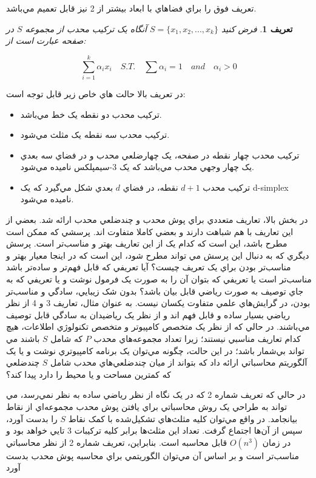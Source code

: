 \documentclass{book}
\newtheorem{defn}[section]{تعریف}
\begin{document}
تعريف فوق را براي فضاهاي با ابعاد بيشتر از 2 نيز قابل تعميم مي‌باشد.

\begin{defn}
    فرض کنيد $S=\{x_1, x_2, ...,x_k\}$ آنگاه يک ترکيب محدب از مجموعه $S$ در صفحه عبارت است از:
    
    $$ \sum_{i=1}^k\alpha_i x_i \quad S.T. \quad  \sum{\alpha_i}=1 \quad and \quad \alpha_i>0$$
\end{defn}


در تعريف بالا حالت هاي خاص زير قابل توجه است: 
\begin{itemize}
    \item
    ترکيب محدب دو نقطه يک خط مي‌باشد.
    \item
    ترکيب محدب سه نقطه يک مثلث مي‌شود.
    \item
    ترکيب محدب چهار نقطه در صفحه، يک چهارضلعي محدب و در فضاي سه بعدي  يک چهار وجهي محدب مي‌باشد که يک 3-سيمپلکس ناميده مي‌شود.
    \item
    ترکيب محدب $d+1$ نقطه، در فضاي $d$ بعدي شکل مي‌گيرد که يک d-simplex ناميده مي‌شود.
\end{itemize}

در بخش بالا، تعاريف متعددي براي پوش محدب و چندضلعي محدب ارائه شد. بعضي از اين تعاريف با هم شباهت دارند و بعضي کاملا متفاوت اند. پرسشي که ممکن است مطرح باشد، اين است که کدام يک از اين تعاريف بهتر و مناسب‌تر است. پرسش ديگري که به دنبال اين پرسش مي تواند مطرح شود، اين است که در اينجا معيار بهتر و مناسب‌تر بودن براي يک تعريف چيست؟ آيا تعريفي که قابل‌ فهم‌تر و ساده‌تر باشد مناسب‌تر است يا تعريفي که بتوان آن را به صورت يک فرمول نوشت و يا تعريفي که به جاي توصيف به صورت رياضي قابل بيان باشد؟ بدون شک زيبايي، سادگي و مناسب‌تر بودن، در گرايش‌هاي علمي متفاوت يکسان نيست. به عنوان مثال، تعاريف 3 و 4 از نظر رياضي بسيار ساده و قابل فهم اند و از نظر يک رياضيدان به سادگي قابل توصيف مي‌باشند. در حالي که از نظر يک متخصص کامپيوتر و متخصص تکنولوژي اطلاعات، هيچ کدام تعاريف مناسبي نيستند؛ زيرا تعداد مجموعه‌هاي محدب $P$ که شامل $S$ باشند مي تواند بي‌شمار باشد؛ در اين حالت، چگونه مي‌توان يک برنامه کامپيوتري نوشت و يا يک آلگوريتم محاسباتي ارائه داد که بتواند از ميان چندضلعي‌هاي محدب شامل $S$ چندضلعي که کمترين مساحت و يا محيط را دارد پيدا کند؟

در حالي که تعريف شماره 2 که در يک نگاه از نظر رياضي ساده به نظر نمي‌رسد، مي تواند به طراحي يک روش محاسباتي  براي يافتن پوش محدب مجموعه‌اي از نقاط بيانجامد. در واقع مي‌توان کليه مثلث‌هاي تشکيل‌شده با کمک نقاط $S$ را بدست آورد، سپس از آن‌ها اجتماع گرفت. تعداد اين مثلث‌ها برابر کليه ترکيبات 3 تايي خواهد بود و در زمان $O(n^3)$ قابل محاسبه است. بنابراين، تعريف شماره 2 از نظر محاسباتي مناسب‌تر است و بر اساس آن مي‌توان الگوريتمي براي محاسبه پوش محدب بدست آورد
\end{document}
